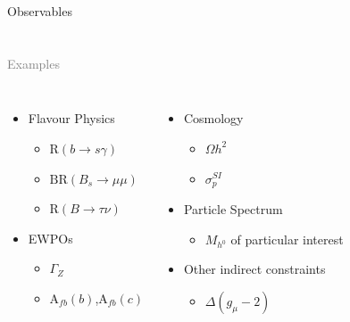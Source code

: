 \documentclass{beamer}
\begin{document}
\begin{frame}{Observables}
\section{\insertframetitle}
  \textcolor{gray}{Examples}
  \begin{columns}[t]
  \column{2.0in}
  \begin{itemize}
    \item Flavour Physics 
      \begin{itemize}
        \item $\textrm{R}\left(b\rightarrow s\gamma\right)$
        \item $\textrm{BR}\left(B_{s}\rightarrow\mu\mu\right)$
        \item $\textrm{R}\left(B\rightarrow\tau\nu\right)$
      \end{itemize}
    \item EWPOs 
      \begin{itemize}
        \item $\Gamma_{Z}$
        \item $\textrm{A}_{fb}(b)$,$\textrm{A}_{fb}(c)$
      \end{itemize}
  \end{itemize}
  \column{2.0in}
  \begin{itemize}
    \item Cosmology
      \begin{itemize}
        \item $\Omega h^{2}$ 
        \item $\sigma_{p}^{SI}$
      \end{itemize}
    \item Particle Spectrum
      \begin{itemize}
        \item $M_{h^{0}}$ of particular interest
      \end{itemize}
    \item Other indirect constraints
      \begin{itemize}
        \item $\Delta(g_{\mu}-2)$
      \end{itemize}
  \end{itemize}
  \end{columns}

\end{frame}
\end{document}
